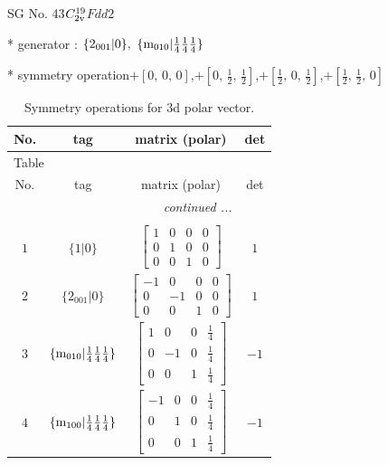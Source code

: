 \documentclass[fleqn,8pt]{jsarticle}
\begin{document}
\setcounter{MaxMatrixCols}{32}

\renewcommand{\tablename}{Table~}
\renewcommand{\figurename}{Figure~}
\begin{center}
\LARGE
SG No. 43\quad$C_{\rm 2v}^{19}$\quad$Fdd2$\quad[ orthorhombic ]
\end{center}

* generator : $\{2{}_{001}|0\},\,\,\{{\rm m}_{010}|\frac{1}{4} \frac{1}{4} \frac{1}{4}\}$

* symmetry operation\quad$+\left[ 0,\, 0,\, 0 \right]$,\quad $+\left[ 0,\, \frac{1}{2},\, \frac{1}{2} \right]$,\quad $+\left[ \frac{1}{2},\, 0,\, \frac{1}{2} \right]$,\quad $+\left[ \frac{1}{2},\, \frac{1}{2},\, 0 \right]$
\renewcommand{\arraystretch}{1.3}
\begin{longtable}{cccc}
\caption{Symmetry operations for 3d polar vector.}
 \\
 \hline \hline
No. & tag & matrix (polar) & det \\ \hline \endfirsthead

\multicolumn{3}{l}{\tablename\ \thetable{}} \\
 \hline \hline
No. & tag & matrix (polar) & det \\ \hline \endhead

 \hline \hline
\multicolumn{3}{r}{\footnotesize\it continued ...} \\ \endfoot

 \hline \hline
\multicolumn{3}{r}{} \\ \endlastfoot

$ 1 $ & $ \{1|0\} $ & $ \begin{bmatrix} 1 & 0 & 0 & 0 \\ 0 & 1 & 0 & 0 \\ 0 & 0 & 1 & 0 \end{bmatrix} $ & $ 1 $ \\ \hline
$ 2 $ & $ \{2{}_{001}|0\} $ & $ \begin{bmatrix} -1 & 0 & 0 & 0 \\ 0 & -1 & 0 & 0 \\ 0 & 0 & 1 & 0 \end{bmatrix} $ & $ 1 $ \\ \hline
$ 3 $ & $ \{{\rm m}_{010}|\frac{1}{4} \frac{1}{4} \frac{1}{4}\} $ & $ \begin{bmatrix} 1 & 0 & 0 & \frac{1}{4} \\ 0 & -1 & 0 & \frac{1}{4} \\ 0 & 0 & 1 & \frac{1}{4} \end{bmatrix} $ & $ -1 $ \\ \hline
$ 4 $ & $ \{{\rm m}_{100}|\frac{1}{4} \frac{1}{4} \frac{1}{4}\} $ & $ \begin{bmatrix} -1 & 0 & 0 & \frac{1}{4} \\ 0 & 1 & 0 & \frac{1}{4} \\ 0 & 0 & 1 & \frac{1}{4} \end{bmatrix} $ & $ -1 $ \\
\end{longtable}
\end{document}
